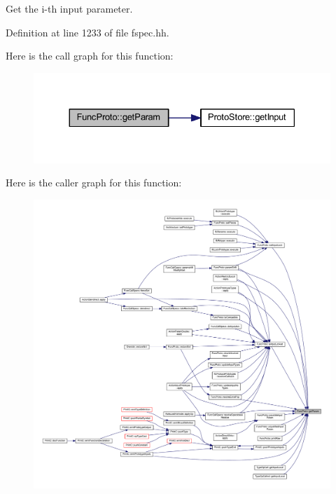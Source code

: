 Get the i-\/th input parameter. 



Definition at line 1233 of file fspec.\+hh.

Here is the call graph for this function\+:
\nopagebreak
\begin{figure}[H]
\begin{center}
\leavevmode
\includegraphics[width=330pt]{class_func_proto_a3c9f97f81ec970bcd40d37f093a1765e_cgraph}
\end{center}
\end{figure}
Here is the caller graph for this function\+:
\nopagebreak
\begin{figure}[H]
\begin{center}
\leavevmode
\includegraphics[width=350pt]{class_func_proto_a3c9f97f81ec970bcd40d37f093a1765e_icgraph}
\end{center}
\end{figure}
\mbox{\label{class_func_proto_a147ea3f4d50df93a0ff16f17ea204ac9}} 
